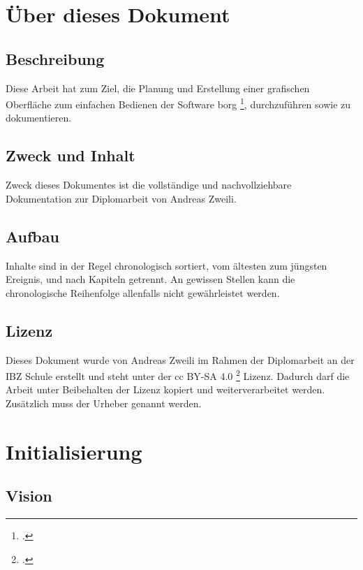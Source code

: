 \section{Über dieses Dokument}
\label{sec:orgcce6e7f}

\subsection{Beschreibung}
\label{sec:org2668df1}

Diese Arbeit hat zum Ziel, die Planung und Erstellung einer grafischen
Oberfläche zum einfachen Bedienen der Software \gls{borg} \footcite{borgbackup},
durchzuführen sowie zu dokumentieren.

\subsection{Zweck und Inhalt}
\label{sec:org74e290b}

Zweck dieses Dokumentes ist die vollständige und nachvollziehbare Dokumentation
zur Diplomarbeit von Andreas Zweili.

\subsection{Aufbau}
\label{sec:org3536775}

Inhalte sind in der Regel chronologisch sortiert, vom ältesten zum jüngsten
Ereignis, und nach Kapiteln getrennt. An gewissen Stellen kann die
chronologische Reihenfolge allenfalls nicht gewährleistet werden.

\subsection{Lizenz}
\label{sec:org3bc24f6}

Dieses Dokument wurde von Andreas Zweili im Rahmen der Diplomarbeit an der IBZ
Schule erstellt und steht unter der \gls{cc} BY-SA 4.0 \footcite{cc} Lizenz.
Dadurch darf die Arbeit unter Beibehalten der Lizenz kopiert und
weiterverarbeitet werden. Zusätzlich muss der Urheber genannt werden.

\cleardoublepage
\section{Initialisierung}
\label{sec:orgdbad29f}
\subsection{Vision}
\label{sec:orgb4650e5}

